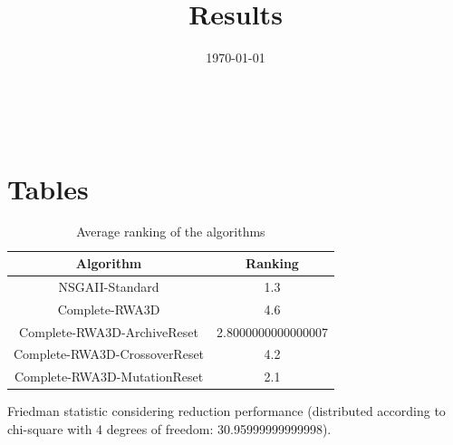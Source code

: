 \documentclass{article}
\title{Results}
\author{}
\date{\today}
\begin{document}
\oddsidemargin 0in \topmargin 0in\maketitle
\
\section{Tables}
\begin{table}[!htp]
\centering
\caption{Average ranking of the algorithms}
\begin{tabular}{c|c}
Algorithm&Ranking\\
\hline
NSGAII-Standard&1.3\\
Complete-RWA3D&4.6\\
Complete-RWA3D-ArchiveReset&2.8000000000000007\\
Complete-RWA3D-CrossoverReset&4.2\\
Complete-RWA3D-MutationReset&2.1\\
\end{tabular}
\end{table}


Friedman statistic considering reduction performance (distributed according to chi-square with 4 degrees of freedom: 30.95999999999998).
\end{document}
